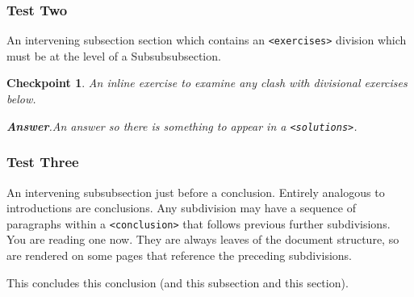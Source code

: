 \documentclass[pdflatex]{sn-jnl}
\theoremstyle{thmstyleone}%
\theoremstyle{thmstyletwo}%
\newtheorem{inlineexercise}[theorem]{Checkpoint}
\theoremstyle{thmstylethree}%
\newcommand{\blocktitlefont}{\relax}
\newcommand{\mono}[1]{\texttt{#1}}
\numberwithin{equation}{section}
\begin{document}
\subsubsection{Test Two}\label{subsection-intro-conclude-4}%
An intervening subsection section which contains an \mono{<exercises>} division which must be at the level of a Subsubsubsection.%
\begin{inlineexercise}\label{subsection-intro-conclude-4-3}%
%
An inline exercise to examine any clash with divisional exercises below.%
\par\smallskip%
\noindent\textbf{\blocktitlefont Answer}.\hypertarget{subsection-intro-conclude-4-3-2}{}\quad{}An answer so there is something to appear in a \mono{<solutions>}.%
\end{inlineexercise}%
%
%
\typeout{************************************************}
\typeout{************************************************}
%
\subsubsection{Test Three}\label{subsection-intro-conclude-5}%
An intervening subsubsection just before a conclusion.%
Entirely analogous to introductions are conclusions.  Any subdivision may have a sequence of paragraphs within a \mono{<conclusion>} that follows previous further subdivisions.  You are reading one now.  They are always leaves of the document structure, so are rendered on some pages that reference the preceding subdivisions.%
\par
This concludes this conclusion (and this subsection and this section).%
%
%
\typeout{************************************************}
\typeout{************************************************}
%
\end{document}
